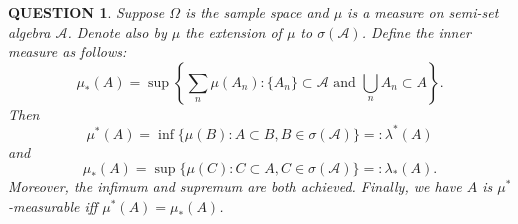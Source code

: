 \documentclass[12pt]{article}
\renewcommand{\(}{\left(}%
\renewcommand{\)}{\right)}%
\renewcommand{\[}{\left[}%
\renewcommand{\]}{\right]}%
\renewcommand{\a}{\mathscr{A}}
\newtheorem{question}{QUESTION}[section]}
\begin{document}
  \begin{question}
   Suppose $\Omega$ is the sample space and $\mu$ is a measure on semi-set algebra $\a$. Denote also by $\mu$ the extension of $\mu$ to $\sigma(\a)$. Define the inner measure as follows:
   \begin{equation*}
    \mu_*(A)=\sup \left\{\sum_n \mu(A_n):\{A_n\}\subset\a\text{ and }\bigcup_n A_n\subset A \right\}.
   \end{equation*}
   Then
   \begin{equation*}
    \mu^*(A)=\inf\{\mu(B):A\subset B,B\in\sigma(\a) \}=:\lambda ^*(A)
   \end{equation*}
   and
   \begin{equation*}
    \mu_*(A)=\sup\{\mu(C):C\subset A,C\in\sigma(\a) \}=:\lambda_*(A).
   \end{equation*}
   Moreover, the infimum and supremum are both achieved. Finally, we have $A$ is $\mu^*$-measurable iff $\mu^*(A)=\mu_*(A)$.
  \end{question}
\end{document}

